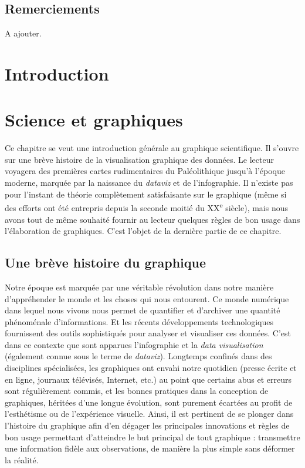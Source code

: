 \documentclass[]{article}
\begin{document}
\hypertarget{remerciements}{%
\subsection*{Remerciements}\label{remerciements}}

A ajouter.

\hypertarget{introduction}{%
\section{Introduction}\label{introduction}}

\hypertarget{science-et-graphiques}{%
\section{Science et graphiques}\label{science-et-graphiques}}

Ce chapitre se veut une introduction générale au graphique scientifique. Il s'ouvre sur une brève histoire de la visualisation graphique des données. Le lecteur voyagera des premières cartes rudimentaires du Paléolithique jusqu'à l'époque moderne, marquée par la naissance du \emph{dataviz} et de l'infographie. Il n'existe pas pour l'instant de théorie complètement satisfaisante sur le graphique (même si des efforts ont été entrepris depuis la seconde moitié du XX\textsuperscript{e} siècle), mais nous avons tout de même souhaité fournir au lecteur quelques règles de bon usage dans l'élaboration de graphiques. C'est l'objet de la dernière partie de ce chapitre.

\hypertarget{une-breve-histoire-du-graphique}{%
\subsection{Une brève histoire du graphique}\label{une-breve-histoire-du-graphique}}

Notre époque est marquée par une véritable révolution dans notre manière d'appréhender le monde et les choses qui nous entourent. Ce monde numérique dans lequel nous vivons nous permet de quantifier et d'archiver une quantité phénoménale d'informations. Et les récents développements technologiques fournissent des outils sophistiqués pour analyser et visualiser ces données. C'est dans ce contexte que sont apparues l'infographie et la \emph{data visualisation} (également connue sous le terme de \emph{dataviz}). Longtemps confinés dans des disciplines spécialisées, les graphiques ont envahi notre quotidien (presse écrite et en ligne, journaux télévisés, Internet, etc.) au point que certains abus et erreurs sont régulièrement commis, et les bonnes pratiques dans la conception de graphiques, héritées d'une longue évolution, sont purement écartées au profit de l'esthétisme ou de l'expérience visuelle. Ainsi, il est pertinent de se plonger dans l'histoire du graphique afin d'en dégager les principales innovations et règles de bon usage permettant d'atteindre le but principal de tout graphique : transmettre une information fidèle aux observations, de manière la plus simple sans déformer la réalité.
\end{document}
